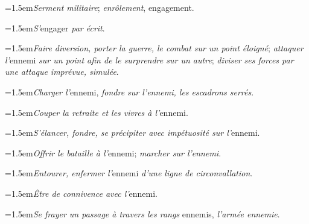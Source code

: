 \par{\dictfontsize\hangindent=1.5em\noindent \textit{Serment militaire}; \textit{enrôlement}, engagement. \par}
\par{\dictfontsize\hangindent=1.5em\noindent \textit{S’}engager \textit{par écrit}. \par}
\par{\dictfontsize\hangindent=1.5em\noindent \textit{Faire diversion, porter la guerre, le combat sur un point éloigné}; \textit{attaquer l’}ennemi \textit{sur un point afin de le surprendre sur un autre}; \textit{diviser ses forces par une attaque imprévue, simulée}. \par}
\par{\dictfontsize\hangindent=1.5em\noindent \textit{Charger l’}ennemi, \textit{fondre sur l’ennemi, les escadrons serrés}. \par}
\par{\dictfontsize\hangindent=1.5em\noindent \textit{Couper la retraite et les vivres à l’}ennemi. \par}
\par{\dictfontsize\hangindent=1.5em\noindent \textit{S’élancer, fondre, se précipiter avec impétuosité sur l’}ennemi. \par}
\par{\dictfontsize\hangindent=1.5em\noindent \textit{Offrir le bataille à l’}ennemi; \textit{marcher sur l’ennemi}. \par}
\par{\dictfontsize\hangindent=1.5em\noindent \textit{Entourer, enfermer l’}ennemi \textit{d’une ligne de circonvallation}. \par}
\par{\dictfontsize\hangindent=1.5em\noindent \textit{Être de connivence avec l’}ennemi. \par}
\par{\dictfontsize\hangindent=1.5em\noindent \textit{Se frayer un passage à travers les rangs} ennemis, \textit{l’armée ennemie}. \par}
